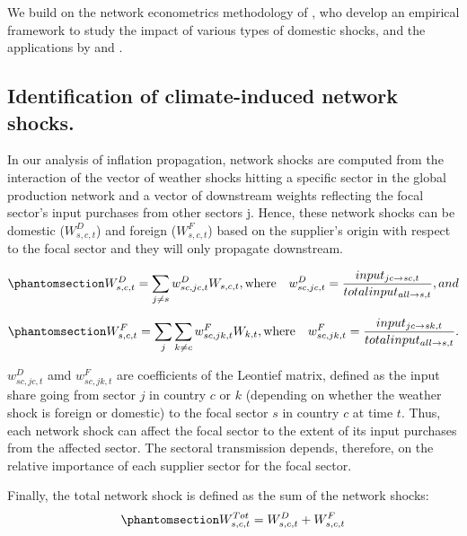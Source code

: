 \documentclass[
  letterpaper,
  DIV=11,
  numbers=noendperiod]{scrartcl}
\begin{document}
We build on the network econometrics methodology of
\citet{acemoglu2016}, who develop an empirical framework to study the
impact of various types of domestic shocks, and the applications by
\citet{zappala2024} and \citet{das2021}.

\subsection{Identification of climate-induced network
shocks.}\label{identification-of-climate-induced-network-shocks.}

In our analysis of inflation propagation, network shocks are computed
from the interaction of the vector of weather shocks hitting a specific
sector in the global production network and a vector of downstream
weights reflecting the focal sector's input purchases from other sectors
j. Hence, these network shocks can be domestic (\(W_{s,c,t}^D\)) and
foreign (\(W_{s,c,t}^F\)) based on the supplier's origin with respect to
the focal sector and they will only propagate downstream.

\begin{equation}\phantomsection\label{eq-dom_net_shock}{
W_{s,c,t}^D = \sum_{j \neq s} w_{sc,jc,t}^D W_{s,c,t} , \text{where} \quad w_{sc,jc,t}^D = \frac{input_{jc \rightarrow sc,t}}{total input_{all \rightarrow s,t}}, and
}\end{equation}

\begin{equation}\phantomsection\label{eq-foreign_net_shock}{
W_{s,c,t}^F = \sum_j \sum_{k \neq c} w_{sc,jk,t}^F W_{k,t} , \text{where} \quad w_{sc,jk,t}^F = \frac{input_{jc \rightarrow sk,t}}{total input_{all \rightarrow s,t}}.
}\end{equation}

\(w_{sc, jc, t}^D\) amd \(w_{sc, jk, t}^F\) are coefficients of the
Leontief matrix, defined as the input share going from sector \(j\) in
country \(c\) or \(k\) (depending on whether the weather shock is
foreign or domestic) to the focal sector \(s\) in country \(c\) at time
\(t\). Thus, each network shock can affect the focal sector to the
extent of its input purchases from the affected sector. The sectoral
transmission depends, therefore, on the relative importance of each
supplier sector for the focal sector.

Finally, the total network shock is defined as the sum of the network
shocks: \begin{equation}\phantomsection\label{eq-total_net_shock}{
W_{s,c,t}^{Tot} = W_{s,c,t}^D+ W_{s,c,t}^F
}\end{equation}
\end{document}
